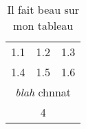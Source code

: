 \begin{table}[h]
\begin{center}
\begin{tabular}{l|l|l} 
   1.1 & 1.2 & 1.3 \\
   1.4 & 1.5 & 1.6 \\
\multicolumn{3}{|c|}{\textit{blah} ch{\sc nn}at}\\
\multicolumn{3}{|c|}{4}\\
\end{tabular}
\end{center}
\caption{Il fait beau sur mon tableau}
\end{table}
